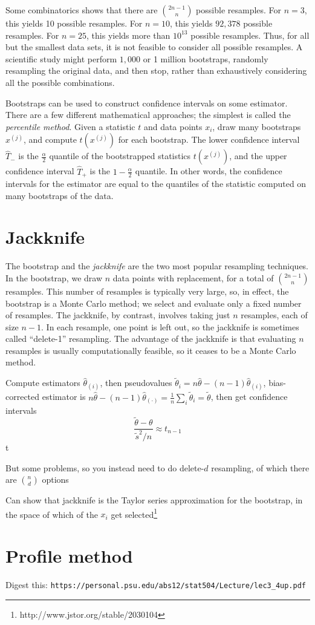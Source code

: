 Some combinatorics shows that there are $\binom{2n-1}{n}$ possible resamples. For $n=3$, this yields 10 possible resamples. For $n=10$, this yields $92,378$ possible resamples. For $n=25$, this yields more than $10^{13}$ possible resamples. Thus, for all but the smallest data sets, it is not feasible to consider all possible resamples. A scientific study might perform $1,000$ or 1 million bootstraps, randomly resampling the original data, and then stop, rather than exhaustively considering all the possible combinations.

Bootstraps can be used to construct confidence intervals on some estimator. There are a few different mathematical approaches; the simplest is called the \emph{percentile method}. Given a statistic $t$ and data points $x_i$, draw many bootstraps $x^{(j)}$, and compute $t(x^{(j)})$ for each bootstrap. The lower confidence interval $\hat{T}_-$ is the $\tfrac{\alpha}{2}$ quantile of the bootstrapped statistics $t(x^{(j)})$, and the upper confidence interval $\hat{T}_+$ is the $1-\tfrac{\alpha}{2}$ quantile. In other words, the confidence intervals for the estimator are equal to the quantiles of the statistic computed on many bootstraps of the data.

\section{Jackknife}

The bootstrap and the \emph{jackknife} are the two most popular resampling techniques. In the bootstrap, we draw $n$ data points with replacement, for a total of $\binom{2n-1}{n}$ resamples. This number of resamples is typically very large, so, in effect, the bootstrap is a Monte Carlo method; we select and evaluate only a fixed number of resamples. The jackknife, by contrast, involves taking just $n$ resamples, each of size $n-1$. In each resample, one point is left out, so the jackknife is sometimes called ``delete-1'' resampling. The advantage of the jackknife is that evaluating $n$ resamples is usually computationally feasible, so it ceases to be a Monte Carlo method.

Compute estimators $\hat{\theta}_{(i)}$, then pseudovalues $\tilde{\theta}_i = n \hat{\theta} -(n-1) \hat{\theta}_{(i)}$, bias-corrected estimator is $n\hat{\theta} - (n-1)\hat{\theta}_{(\cdot)} = \frac{1}{n}\sum_i \tilde{\theta}_i = \tilde{\theta}$, then get confidence intervals
$$
\frac{\tilde{\theta} - \theta}{\tilde{s}^2 /n} \approx t_{n-1}
$$t

But some problems, so you instead need to do delete-$d$ resampling, of which there are $\binom{n}{d}$ options

Can show that jackknife is the Taylor series approximation for the bootstrap, in the space of which of the $x_i$ get selected\footnote{http://www.jstor.org/stable/2030104}

\section{Profile method}

Digest this: \texttt{https://personal.psu.edu/abs12/stat504/Lecture/lec3\_4up.pdf}